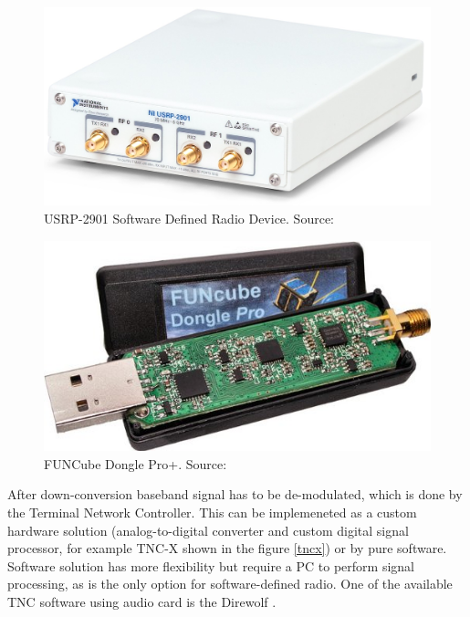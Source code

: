 \begin{minipage}{\linewidth}
    \centering
    \begin{minipage}{0.45\linewidth}
        \begin{figure}[H]
            \centering
            \includegraphics[width=0.3\paperwidth]{img/2/ni_2901.png}
            \caption{USRP-2901 Software Defined Radio Device. Source: \cite{ni_2901}}
            \label{ni_2901}
        \end{figure}
    \end{minipage}
    \hspace{0.05\linewidth}
    \begin{minipage}{0.45\linewidth}
        \begin{figure}[H]
            \centering
            \includegraphics[width=0.3\paperwidth]{img/2/funcube.jpg}
            \caption{FUNCube Dongle Pro+. Source: \cite{funcube}}
            \label{funcube}
        \end{figure}
    \end{minipage}
\end{minipage}

After down-conversion baseband signal has to be de-modulated, which is done by the Terminal Network Controller. This can be implemeneted as a custom hardware solution (analog-to-digital converter and custom digital signal processor, for example TNC-X shown in the figure \ref{tncx}) or by pure software. Software solution has more flexibility but require a PC to perform signal processing, as is the only option for software-defined radio. One of the available TNC software using audio card is the Direwolf \cite{direwolf}.


